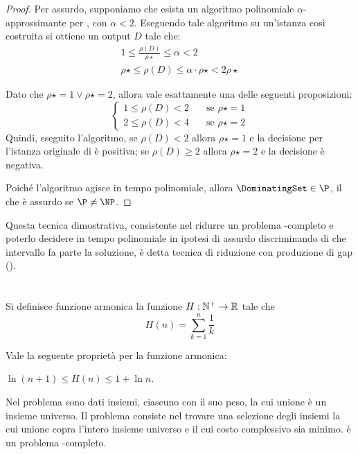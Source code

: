 \begin{proof}
	Per assurdo, supponiamo che esista un algoritmo polinomiale $\alpha$-approssimante per \CenterSelection, con $\alpha < 2$.
	Eseguendo tale algoritmo su un'istanza così costruita si ottiene un output $D$ tale che:
	\begin{gather*}
		1\leq\frac{\rho(D)}{\rho\star}\leq\alpha<2 \\
		\rho\star\leq\rho(D)\leq\alpha\cdot\rho\star<2\rho\star
	\end{gather*}

	Dato che $\rho\star=1\lor\rho\star=2$, allora vale esattamente una delle seguenti proposizioni:
	\begin{equation*}
		\begin{cases}
			1\leq\rho(D)<2\quad & \text{se } \rho\star=1 \\
			2\leq\rho(D)<4\quad & \text{se } \rho\star=2
		\end{cases}
	\end{equation*}
	Quindi, eseguito l'algoritmo, se $\rho(D)<2$ allora $\rho\star=1$ e la decisione per l'istanza originale di \DominatingSet è positiva; se $\rho(D)\geq2$ allora $\rho\star=2$ e la decisione è negativa.

	Poiché l'algoritmo agisce in tempo polinomiale, allora $\DominatingSet\in\P$, il che è assurdo se $\P\neq\NP$.
\end{proof}
Questa tecnica dimostrativa, consistente nel ridurre un problema \NP-completo e poterlo decidere in tempo polinomiale in ipotesi di assurdo discriminando di che intervallo fa parte la soluzione, è detta tecnica di riduzione con produzione di gap ().



\section{\MinSetCover}\label{sec:SetCover}
Si definisce funzione armonica la funzione $H:\mathbb N^+\to\mathbb R$ tale che
\begin{equation*}
	H(n)=\sum_{k=1}^n \frac 1k
\end{equation*}

Vale la seguente proprietà per la funzione armonica:
\begin{theorem}
	$\ln(n+1)\leq H(n)\leq 1+\ln n$.
\end{theorem}

Nel problema \MinSetCover sono dati insiemi, ciascuno con il suo peso, la cui unione è un insieme universo.
Il problema consiste nel trovare una selezione degli insiemi la cui unione copra l'intero insieme universo e il cui costo complessivo sia minimo.
\MinSetCover è un problema \NPO-completo.

